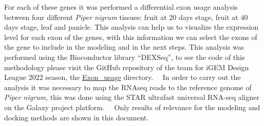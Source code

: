 \documentclass[12pt]{article}
\begin{document}
	For each of these genes it was performed a differential exon usage analysis between four different \textit{Piper nigrum} tissues: fruit at 20 days stage, fruit at 40 days stage, leaf and panicle. This analysis can help us to visualize the expression level for each exon of the genes, with this information we can select the exons of the gene to include in the modeling and in the next steps. This analysis was performed using the Bioconductor library ``DEXSeq'', to see the code of this methodology please visit the GitHub repository of the team for iGEM Design League 2022 season, the \href{https://github.com/GerardoCMM/Synthetic-Biobots-IGEM-DL-2022/tree/main/Exon_usage}{Exon\_usage} directory. \cite{bioconductor,dexseq,dexseq_2}\ \ In order to carry out the analysis it was necessary to map the RNAseq reads to the reference genome of \textit{Piper nigrum}, this was done using the STAR ultrafast universal RNA-seq aligner on the Galaxy project platform. \cite{genome,star,galaxy}\ \ Only results of relevance for the modeling and docking methods are shown in this document.
	
\end{document}
